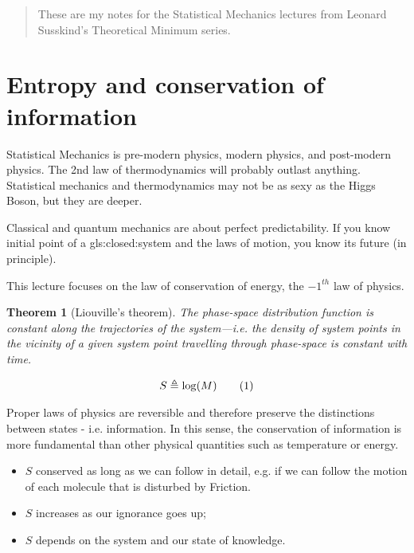 \documentclass[]{article}
\newcommand\numberthis{\addtocounter{equation}{1}\tag{\theequation}}
\newtheorem{thm}{Theorem}
\begin{document}
\begin{abstract}
These are my notes for the Statistical Mechanics lectures from Leonard Susskind's Theoretical Minimum series.
\end{abstract}

\tableofcontents

\listoffigures


\section{Entropy and conservation of information}

Statistical Mechanics is pre-modern physics, modern physics, and post-modern physics. The 2nd law of thermodynamics will probably outlast anything. Statistical mechanics and thermodynamics may not be as sexy as the Higgs Boson, but they are deeper.

Classical and quantum mechanics are about perfect predictability. If you know initial point of a \gls{gls:closed:system} and the laws of motion, you know its future (in principle).

This lecture focuses on the law of conservation of energy, the $-1^{th}$ law of physics. 

\begin{thm}[Liouville's theorem]
	The phase-space distribution function is constant along the trajectories of the system—i.e. the density of system points in the vicinity of a given system point travelling through phase-space is constant with time.
\end{thm}

\begin{align*}
S \triangleq \log(M) \numberthis \label{eq:entropy:simple}
\end{align*}

Proper laws of physics are reversible and therefore preserve the distinctions between states - i.e. information.  In this sense, the conservation of information is more fundamental than other physical quantities such as temperature or energy.  
\begin{itemize}
	\item $S$ conserved as long as we can follow in detail, e.g. if we can follow the motion of each molecule that is disturbed by Friction.
	\item $S$ increases as our ignorance goes up;
	\item $S$ depends on the system and our state of knowledge.
\end{itemize}
\end{document}
